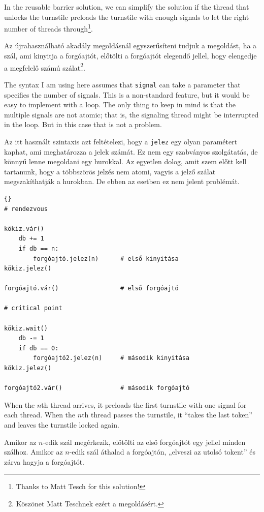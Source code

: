 \documentclass{book}
\begin{document}
In the reusable barrier solution, we can simplify the solution if the
thread that unlocks the turnstile preloads the turnstile with enough
signals to let the right number of threads through\footnote{Thanks to
Matt Tesch for this solution!}.

Az újrahasználható akadály megoldásnál egyszerűsíteni tudjuk a megoldást,
ha a szál, ami kinyitja a forgóajtót, előtölti a forgóajtót elegendő jellel,
hogy elengedje a megfelelő számú
szálat\footnote{Köszönet Matt Teschnek ezért a megoldásért.}.

The syntax I am using here assumes that {\tt signal} can take a
parameter that specifies the number of signals.  This is a
non-standard feature, but it would be easy to implement with a loop.
The only thing to keep in mind is that the multiple signals are not
atomic; that is, the signaling thread might be interrupted in the
loop.  But in this case that is not a problem.

Az itt használt szintaxis azt feltételezi, hogy a {\tt jelez} egy olyan paramétert
kaphat, ami meghatározza a jelek számát. Ez nem egy szabványos
szolgátatás, de könnyű lenne megoldani egy hurokkal. Az egyetlen dolog,
amit szem előtt kell tartanunk, hogy a többszörös jelzés nem atomi, vagyis
a jelző szálat megszakíthatják a hurokban. De ebben az esetben ez nem
jelent problémát.

\begin{lstlisting}[title={Előre feltöltött újrahasználható forgóajtó megoldás}]{}
# rendezvous

kökiz.vár()
    db += 1
    if db == n:
        forgóajtó.jelez(n)      # első kinyitása
kökiz.jelez()

forgóajtó.vár()                 # első forgóajtó

# critical point

kökiz.wait()
    db -= 1
    if db == 0:
        forgóajtó2.jelez(n)     # második kinyitása
kökiz.jelez()

forgóajtó2.vár()                # második forgóajtó
\end{lstlisting}

When the $n$th thread arrives, it preloads the first turnstile with
one signal for each thread.  When the $n$th thread passes the
turnstile, it ``takes the last token'' and leaves the turnstile locked
again.

Amikor az $n$-edik szál megérkezik, előtölti az első forgóajtót
egy jellel minden szálhoz. Amikor az $n$-edik szál áthalad a forgóajtón,
„elveszi az utolsó tokent” és zárva hagyja a forgóajtót.
\end{document}
